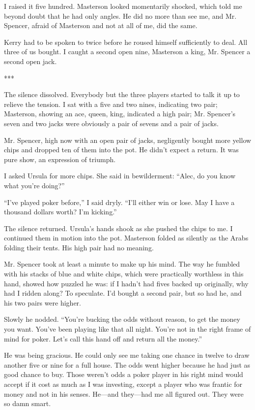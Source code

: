 \documentclass{novel}
\begin{document}
{I raised it five hundred. Masterson looked momentarily shocked, which told me beyond doubt that he had only angles. He did no more than see me, and Mr. Spencer, afraid of Masterson and not at all of me, did the same.

Kerry had to be spoken to twice before he roused himself sufficiently to deal. All three of us bought. I caught a second open nine, Masterson a king, Mr. Spencer a second open jack.

***

The silence dissolved. Everybody but the three players started to talk it up to relieve the tension. I sat with a five and two nines, indicating two pair; Masterson, showing an ace, queen, king, indicated a high pair; Mr. Spencer’s seven and two jacks were obviously a pair of sevens and a pair of jacks.

Mr. Spencer, high now with an open pair of jacks, negligently bought more yellow chips and dropped ten of them into the pot. He didn’t expect a return. It was pure show, an expression of triumph.

I asked Ursula for more chips. She said in bewilderment: “Alec, do you know what you’re doing?”

“I’ve played poker before,” I said dryly. “I’ll either win or lose. May I have a thousand dollars worth? I’m kicking.”

The silence returned. Ursula’s hands shook as she pushed the chips to me. I continued them in motion into the pot. Masterson folded as silently as the Arabs folding their tents. His high pair had no meaning.

Mr. Spencer took at least a minute to make up his mind. The way he fumbled with his stacks of blue and white chips, which were practically worthless in this hand, showed how puzzled he was: if I hadn’t had fives backed up originally, why had I ridden along? To speculate. I’d bought a second pair, but so had he, and his two pairs were higher.

Slowly he nodded. “You’re bucking the odds without reason, to get the money you want. You’ve been playing like that all night. You’re not in the right frame of mind for poker. Let’s call this hand off and return all the money.”

He was being gracious. He could only see me taking one chance in twelve to draw another five or nine for a full house. The odds went higher because he had just as good chance to buy. Those weren’t odds a poker player in his right mind would accept if it cost as much as I was investing, except a player who was frantic for money and not in his senses. He—and they—had me all figured out. They were so damn smart.

}
\end{document}
